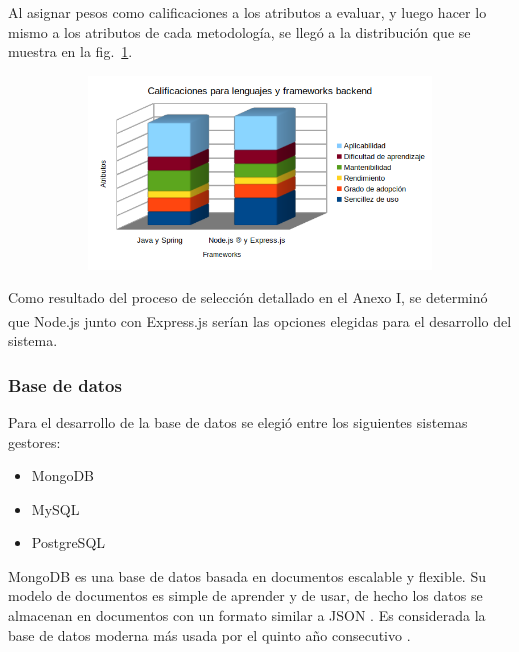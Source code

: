 \documentclass{article}
\begin{document}
Al asignar pesos como calificaciones a los atributos a evaluar, y luego hacer lo mismo a los atributos de cada metodología, se llegó a la distribución que se muestra en la fig.~\ref{fig:lenguajesFrameworksBackend}.
\begin{figure}[H]
	\caption{Calificaciones para lenguajes y frameworks backend}
    \begin{subfigure}{1\textwidth}
	\includegraphics[width=1\textwidth]{calificaciones para lenguajes y frameworks backend.png}
    \end{subfigure}
	\label{fig:lenguajesFrameworksBackend}
\end{figure}
\vspace{-1.0\baselineskip}
Como resultado del proceso de selección detallado en el Anexo I, se determinó que Node.js\textsuperscript{\textregistered} junto con Express.js serían las opciones elegidas para el desarrollo del sistema.
\subsubsection{Base de datos}
Para el desarrollo de la base de datos se elegió entre los siguientes sistemas gestores:
\begin{itemize}
    \item MongoDB
    \item MySQL
    \item PostgreSQL
\end{itemize}
MongoDB es una base de datos basada en documentos escalable y flexible. Su modelo de documentos es simple de aprender y de usar, de hecho los datos se almacenan en documentos con un formato similar a JSON \parencite{whatIsMongoDBOfficial}. Es considerada la base de datos moderna más usada por el quinto año consecutivo \parencite{mongoOfficialHome}.
\end{document}
